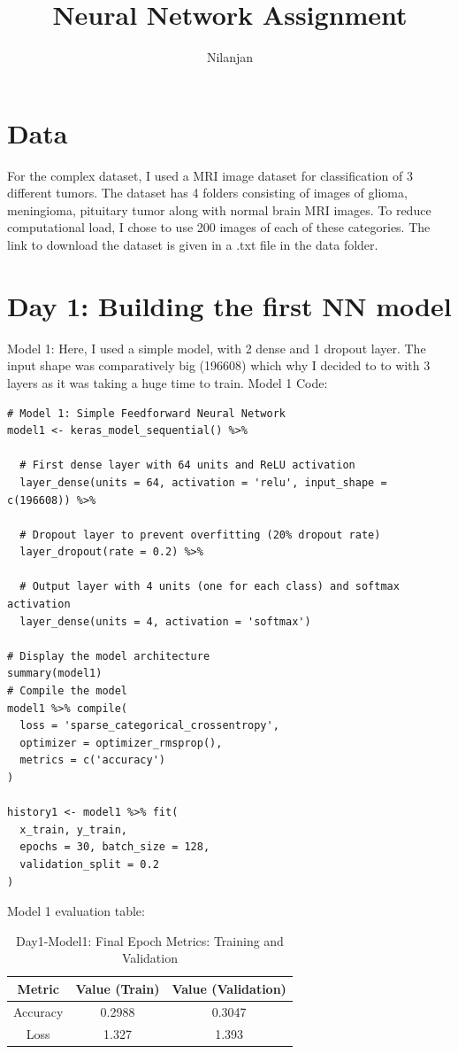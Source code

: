 \documentclass[letterpaper,11pt]{article}
\title{Neural Network Assignment}
\author[a,*]{Nilanjan}
\affil[a]{Department of Molecular Biosciences, University of Kansas}
\affil[*]{Corresponding author, nilanjan.roy@ku.edu}
\begin{document}
\maketitle

\section{Data}
For the complex dataset, I used a MRI image dataset for classification of 3 different tumors. The dataset has 4 folders consisting of images of glioma, meningioma, pituitary tumor along with normal brain MRI images. To reduce computational load, I chose to use 200 images of each of these categories. The link to download the dataset is given in a .txt file in the data folder.

\section{Day 1: Building the first NN model}
Model 1:
Here, I used a simple model, with 2 dense and 1 dropout layer. The input shape was comparatively big (196608) which why I decided to to with 3 layers as it was taking a huge time to train.
Model 1 Code:
\begin{verbatim}
# Model 1: Simple Feedforward Neural Network
model1 <- keras_model_sequential() %>% 
  
  # First dense layer with 64 units and ReLU activation
  layer_dense(units = 64, activation = 'relu', input_shape = c(196608)) %>% 
  
  # Dropout layer to prevent overfitting (20% dropout rate)
  layer_dropout(rate = 0.2) %>% 
  
  # Output layer with 4 units (one for each class) and softmax activation
  layer_dense(units = 4, activation = 'softmax')

# Display the model architecture
summary(model1)
# Compile the model
model1 %>% compile(
  loss = 'sparse_categorical_crossentropy',
  optimizer = optimizer_rmsprop(),
  metrics = c('accuracy')
)

history1 <- model1 %>% fit(
  x_train, y_train,
  epochs = 30, batch_size = 128,
  validation_split = 0.2
)
\end{verbatim}
Model 1 evaluation table:
\begin{table}[h!]
    \centering
    \begin{tabular}{|c|c|c|}
        \hline
        \textbf{Metric} & \textbf{Value (Train)} & \textbf{Value (Validation)} \\ \hline
        Accuracy & 0.2988 & 0.3047 \\ \hline
        Loss & 1.327 & 1.393 \\ \hline
    \end{tabular}
    \caption{Day1-Model1: Final Epoch Metrics: Training and Validation}
    \label{tab:D1M1_final_epoch}
\end{table}
\end{document}
